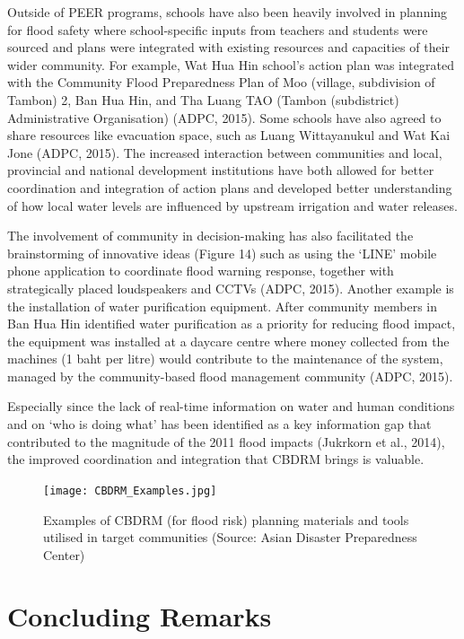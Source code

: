 Outside of PEER programs, schools have also been heavily involved in planning for flood safety where school-specific inputs from teachers and students were sourced and plans were integrated with existing resources and capacities of their wider community. For example, Wat Hua Hin school’s action plan was integrated with the Community Flood Preparedness Plan of Moo (village, subdivision of Tambon) 2, Ban Hua Hin, and Tha Luang TAO (Tambon (subdistrict) Administrative Organisation) (ADPC, 2015). Some schools have also agreed to share resources like evacuation space, such as Luang Wittayanukul and Wat Kai Jone (ADPC, 2015). The increased interaction between communities and local, provincial and national development institutions have both allowed for better coordination and integration of action plans and developed better understanding of how local water levels are influenced by upstream irrigation and water releases.

The involvement of community in decision-making has also facilitated the brainstorming of innovative ideas (Figure 14) such as using the ‘LINE’ mobile phone application to coordinate flood warning response, together with strategically placed loudspeakers and CCTVs (ADPC, 2015). Another example is the installation of water purification equipment. After community members in Ban Hua Hin identified water purification as a priority for reducing flood impact, the equipment was installed at a daycare centre where money collected from the machines (1 baht per litre) would contribute to the maintenance of the system, managed by the community-based flood management community (ADPC, 2015).  

Especially since the lack of real-time information on water and human conditions and on ‘who is doing what’ has been identified as a key information gap that contributed to the magnitude of the 2011 flood impacts (Jukrkorn et al., 2014), the improved coordination and integration that CBDRM brings is valuable. 

\begin{figure}[htb]
	\centering
		\texttt{[image: CBDRM\_Examples.jpg]}
	\caption{Examples of CBDRM (for flood risk) planning materials and tools utilised in target communities  (Source: Asian Disaster Preparedness Center)}
	\label{fig:CBDRM_Examples}
\end{figure}



\section{Concluding Remarks}

